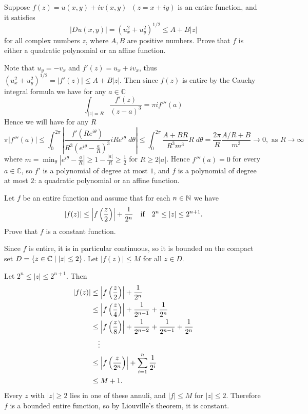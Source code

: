 \begin{problem}
Suppose $f(z) = u(x,y)+iv(x,y)\;\;(z=x+iy)$ is an entire function, and it satisfies 
    $$|Du(x,y)| = (u_x^2 + u_y^2)^{1/2}\leq A+B|z|$$
    for all complex numbers $z$, where $A,B$ are positive numbers. Prove that $f$ is either a quadratic polynomial or an affine function.
\begin{solution}
Note that $u_y = -v_x$ and $f'(z) =u_x + i v_x$, thus $(u_x^2 + u_y^2)^{1/2}= |f'(z)|\leq A+B|z|$. Then since $f(z)$ is entire by the Cauchy integral formula we have for any $a\in \mathbb{C}$
    \[\int_{|z|=R} \frac{f'(z)}{(z-a)^3}= \pi i f'''(a)\]
    Hence we will have for any $R$
    \[\pi |f'''(a)| \leq \int_0^{2\pi} \left|\frac{f'(Re^{i\theta})}{R^3(e^{i\theta}-\frac{a}{R})^3} iRe^{i\theta} \; d\theta \right|\leq \int_0^{2\pi} \frac{A+BR}{R^3 m^3} R \; d\theta =  \frac{2\pi}{R} \frac{A/R + B}{m^3}\to 0, \text{ as } R\to \infty  \]
where $m=\min_\theta\left|e^{i\theta}-\frac{a}{R}\right|\geq 1-\frac{|a|}{R}\geq \frac12$ for $R\geq 2|a|$. Hence $f'''(a)=0$ for every $a\in\mathbb{C}$, so $f'$ is a polynomial of degree at most $1$, and $f$ is a polynomial of degree at most $2$: a quadratic polynomial or an affine function.
\end{solution}
\end{problem}

\begin{problem}
Let $f$ be an entire function and assume that for each $n \in \mathbb{N}$ we have
$$ |f(z)| \leq \left\lvert f\left( \frac{z}{2}\right)\right\rvert + \frac{1}{2^n} \quad \text{if} \quad 2^n \leq |z| \leq 2^{n+1}. $$
Prove that $f$ is a constant function.
\begin{solution}
Since $f$ is entire, it is in particular continuous, so it is bounded on the compact set $D = \left\{ z \in \mathbb{C} \mid |z| \leq 2\right\}$. Let $|f(z)| \leq M$ for all $z \in D$.

Let $2^n \leq |z| \leq 2^{n+1}$. Then
\begin{align*}
    |f(z)| &\leq \left\lvert f\left( \frac{z}{2}\right)\right\rvert + \frac{1}{2^n} \\
    &\leq \left\lvert f\left( \frac{z}{4}\right)\right\rvert + \frac{1}{2^{n-1}} + \frac{1}{2^n} \\
    &\leq \left\lvert f\left( \frac{z}{8}\right)\right\rvert + \frac{1}{2^{n-2}} + \frac{1}{2^{n-1}} + \frac{1}{2^n} \\
    &\quad \vdots \\
    &\leq \left\lvert f\left( \frac{z}{2^{n}}\right)\right\rvert + \sum_{i=1}^n \frac{1}{2^i} \\ &\leq M + 1.
\end{align*}
Every $z$ with $|z|\geq 2$ lies in one of these annuli, and $|f|\leq M$ for $|z|\leq 2$. Therefore $f$ is a bounded entire function, so by Liouville's theorem, it is constant.
\end{solution}
\end{problem}


